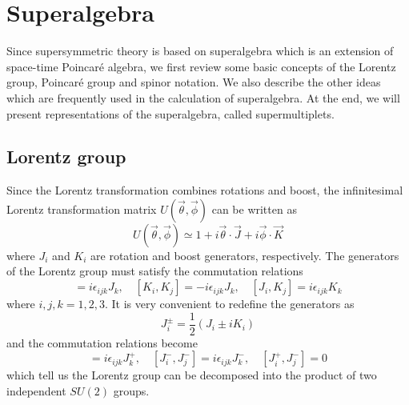 \documentclass[12pt]{report}
\begin{document}
\chapter{Superalgebra}
Since supersymmetric theory is based on superalgebra which is an extension of space-time Poincar\'{e} algebra, we first review some basic concepts of the Lorentz group, Poincar\'{e} group and spinor notation.
We also describe the other ideas which are frequently used in the calculation of superalgebra.
At the end, we will present representations of the superalgebra, called supermultiplets.%



\section{Lorentz group}
Since the Lorentz transformation combines rotations and boost, the infinitesimal Lorentz transformation matrix $U(\vec{\theta}, \vec{\phi}) $ can be written as
\begin{equation}
U(\vec{\theta}, \vec{\phi}) \simeq 1  + i \vec{\theta} \cdot \vec{J} + i \vec{\phi} \cdot \vec{K}
\end{equation}
where $J_{i}$ and $K_{i}$ are rotation and boost generators, respectively.
The generators of the Lorentz group must satisfy the commutation relations
\begin{equation}
[J_{i}, J_{j}] = i \epsilon_{ijk} J_{k}, \quad
 [K_{i}, K_{j}] = -i \epsilon_{ijk} J_{k}, \quad 
 [J_{i}, K_{j}] = i \epsilon_{ijk} K_{k}
\end{equation}
where $i, j, k = 1, 2, 3$.
It is very convenient to redefine the generators as
\begin{equation}
J^{\pm}_{i} = \frac{1}{2} (J_{i} \pm i K_{i})
\end{equation}
and the commutation relations become
\begin{equation}
[J^{+}_{i}, J^{+}_{j}] = i \epsilon_{ijk} J^{+}_{k}, \quad 
[J^{-}_{i}, J^{-}_{j}] = i \epsilon_{ijk} J^{-}_{k}, \quad 
[J^{+}_{i}, J^{-}_{j}] = 0
\end{equation}
which tell us the Lorentz group can be decomposed into the product of two independent $SU(2)$ groups.
\end{document}
